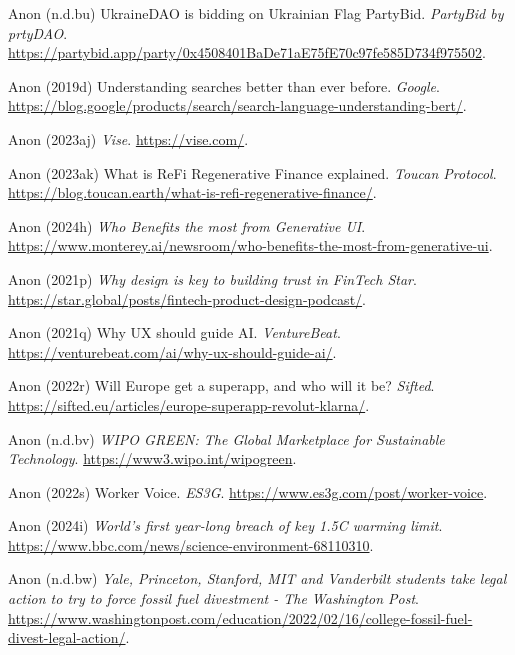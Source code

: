 \documentclass[
  letterpaper,
  DIV=11,
  numbers=noendperiod]{scrartcl}
\newlength{\cslhangindent}
\newenvironment{CSLReferences}[2] %
 {\begin{list}{}{%
  \setlength{\itemindent}{0pt}
  \setlength{\leftmargin}{0pt}
  \setlength{\parsep}{0pt}
  \ifodd #1
   \setlength{\leftmargin}{\cslhangindent}
   \setlength{\itemindent}{-1\cslhangindent}
  \fi
  \setlength{\itemsep}{#2\baselineskip}}}
 {\end{list}}
\begin{document}
\begin{CSLReferences}{0}{1}
Anon (n.d.bu) {UkraineDAO} is bidding on {Ukrainian Flag} {\textbar}
{PartyBid}. \emph{PartyBid by prtyDAO}.
\url{https://partybid.app/party/0x4508401BaDe71aE75fE70c97fe585D734f975502}.

Anon (2019d) Understanding searches better than ever before.
\emph{Google}.
\url{https://blog.google/products/search/search-language-understanding-bert/}.

Anon (2023aj) \emph{Vise}. \url{https://vise.com/}.

Anon (2023ak) What is {ReFi} {\textbar} {Regenerative Finance}
explained. \emph{Toucan Protocol}.
\url{https://blog.toucan.earth/what-is-refi-regenerative-finance/}.

Anon (2024h) \emph{Who {Benefits} the most from {Generative UI}}.
\url{https://www.monterey.ai/newsroom/who-benefits-the-most-from-generative-ui}.

Anon (2021p) \emph{Why design is key to building trust in {FinTech}
{\textbar} {Star}}.
\url{https://star.global/posts/fintech-product-design-podcast/}.

Anon (2021q) Why {UX} should guide {AI}. \emph{VentureBeat}.
\url{https://venturebeat.com/ai/why-ux-should-guide-ai/}.

Anon (2022r) Will {Europe} get a superapp, and who will it be?
\emph{Sifted}.
\url{https://sifted.eu/articles/europe-superapp-revolut-klarna/}.

Anon (n.d.bv) \emph{{WIPO GREEN}: {The Global Marketplace} for
{Sustainable Technology}}. \url{https://www3.wipo.int/wipogreen}.

Anon (2022s) Worker {Voice}. \emph{ES3G}.
\url{https://www.es3g.com/post/worker-voice}.

Anon (2024i) \emph{World's first year-long breach of key 1.{5C} warming
limit}. \url{https://www.bbc.com/news/science-environment-68110310}.

Anon (n.d.bw) \emph{Yale, {Princeton}, {Stanford}, {MIT} and
{Vanderbilt} students take legal action to try to force fossil fuel
divestment - {The Washington Post}}.
\url{https://www.washingtonpost.com/education/2022/02/16/college-fossil-fuel-divest-legal-action/}.


\end{CSLReferences}
\end{document}
